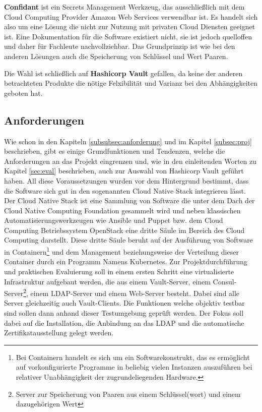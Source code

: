 \documentclass[
book,
a4paper,   
titlepage,  
halfparskip,
12pt        
]{scrartcl}
\begin{document}
\begin{onehalfspacing}
\textbf{Confidant} ist ein Secrets Management Werkzeug, das ausschließlich mit dem Cloud Computing Provider Amazon Web Services verwendbar ist. Es handelt sich also um eine Lösung die nicht zur Nutzung mit privaten Cloud Diensten geeignet ist. Eine Dokumentation für die Software existiert nicht, sie ist jedoch quelloffen und daher für Fachleute nachvollziehbar. Das Grundprinzip ist wie bei den anderen Lösungen auch die Speicherung von Schlüssel und Wert Paaren.\cite{lyft}

Die Wahl ist schließlich auf \textbf{Hashicorp Vault} gefallen, da keine der anderen betrachteten Produkte die nötige Felxibilität und Varianz bei den Abhängigkeiten geboten hat. 

\subsection{Anforderungen}
\label{subsec:anf}
Wie schon in den Kapiteln \vref{subsubsec:anforderung} und im Kapitel \vref{subsec:proj} beschrieben, gibt es einige Grundfunktionen und Tendenzen, welche die Anforderungen an das Projekt eingrenzen und, wie in den einleitenden Worten zu Kapitel \vref{sec:eval} beschrieben, auch zur Auswahl von Hashicorp Vault geführt haben. All diese Voraussetzungen wurden vor dem Hintergrund bestimmt, dass die Software sich gut in den sogenannten Cloud Native Stack integrieren lässt. Der Cloud Native Stack ist eine Sammlung von Software die unter dem Dach der Cloud Native Computing Foundation gesammelt wird und neben klassischen Automatisierungswerkzeugen wie Ansible und Puppet bzw. dem Cloud Computing Betriebssystem OpenStack eine dritte Säule im Bereich des Cloud Computing darstellt. Diese dritte Säule beruht auf der Ausführung von Software in Containern\footnote{Bei Containern handelt es sich um ein Softwarekonstrukt, das es ermöglicht auf vorkonfigurierte Programme in beliebig vielen Instanzen auszuführen bei relativer Unabhängigkeit der zugrundeliegenden Hardware.} und dem Management beziehungsweise der Verteilung dieser Container durch ein Programm Namens Kubernetes.\newline
Zur Projektdurchführung und praktischen Evaluierung soll in einem ersten Schritt eine virtualisierte Infrastruktur aufgebaut werden, die aus einem Vault-Server, einem Consul-Server\footnote{Server zur Speicherung von Paaren aus einem Schlüssel(wort) und einem dazugehörigen Wert}, einem \acs{LDAP}-Server und einem Web-Server besteht. Dabei sind alle Server gleichzeitig auch Vault-Clients. Die Funktionen welche objektiv testbar sind sollen dann anhand dieser Testumgebung geprüft werden. Der Fokus soll dabei auf die Installation,  die Anbindung an das \ac{LDAP} und die automatische Zertifikatausstellung gelegt werden.


\end{onehalfspacing}
\end{document}

